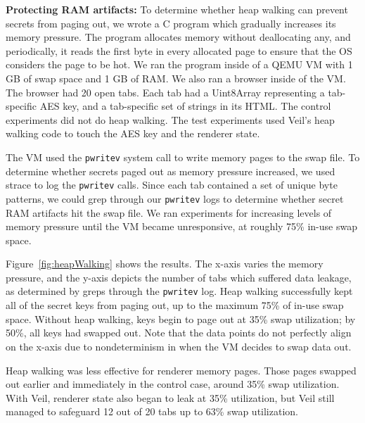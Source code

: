 \noindent
{\bf Protecting RAM artifacts:} To determine
whether heap walking can prevent secrets from
paging out, we wrote a C program which gradually
increases its memory pressure. The program allocates
memory without deallocating any, and periodically,
it reads the first byte in every allocated page
to ensure that the OS considers the page to be hot.
We ran the program inside of a QEMU VM with 1 GB
of swap space and 1 GB of RAM. We also ran a browser
inside of the VM. The browser had 20 open tabs.
Each tab had a Uint8Array representing a tab-specific
AES key, and a tab-specific set of strings in its
HTML. The control experiments did not do heap walking.
The test experiments used Veil's heap walking code
to touch the AES key and the renderer state.

The VM used the \texttt{pwritev} system call to
write memory pages to the swap file. To determine
whether secrets paged out as memory pressure
increased, we used strace to log the \texttt{pwritev}
calls. Since each tab contained a set of 
unique byte patterns, we could grep through our
\texttt{pwritev} logs to determine whether secret
RAM artifacts hit the swap file. We ran experiments
for increasing levels of memory pressure until the
VM became unresponsive, at roughly 75\% in-use
swap space.

Figure~\ref{fig:heapWalking} shows the results.
The x-axis varies the memory pressure, and the
y-axis depicts the number of tabs which suffered
data leakage, as determined by greps through the
\texttt{pwritev} log. Heap walking successfully
kept all of the secret keys from paging out, up
to the maximum 75\% of in-use swap space. Without
heap walking, keys begin to page out at 35\%
swap utilization; by 50\%, all keys had swapped
out. Note that the data points do not perfectly
align on the x-axis due to nondeterminism in
when the VM decides to swap data out.

Heap walking was less effective for renderer
memory pages. Those pages swapped out earlier
and immediately in the control case, around
35\% swap utilization. With Veil, renderer state
also began to leak at 35\% utilization, but
Veil still managed to safeguard 12 out of 20 tabs
up to 63\% swap utilization.


